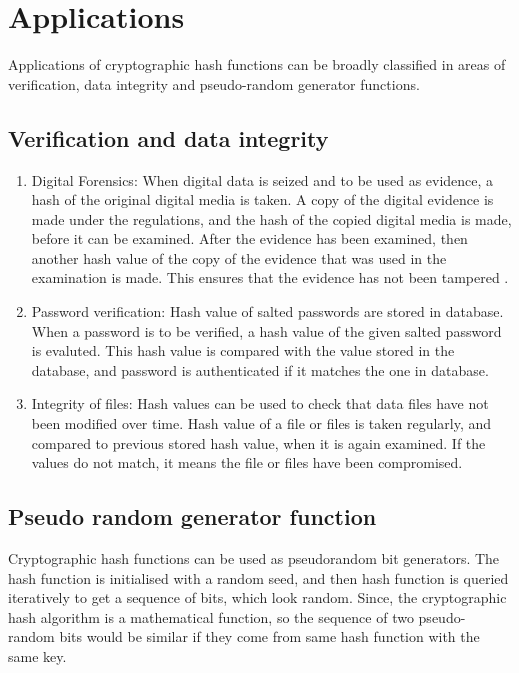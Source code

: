 \section{Applications}

Applications of cryptographic hash functions can be broadly classified in areas of verification, data
integrity and pseudo-random generator functions.

  \subsection{Verification and data integrity}
  \begin{enumerate}

    \item Digital Forensics: When digital data is seized and to be used as evidence, a hash of the original
    digital media is taken. A copy of the digital evidence is made under the regulations, and the hash of the
    copied digital media is made, before it can be examined. After the evidence has been examined, then another
    hash value of the copy of the evidence that was used in the examination is made. This ensures that the evidence
    has not been tampered \cite{00013}.

    \item Password verification: Hash value of salted passwords are stored in database. When a password is to be
    verified, a hash value of the given salted password is evaluted. This hash value is compared
    with the value stored in the database, and password is authenticated if it matches the one in database.

    \item Integrity of files: Hash values can be used to check that data files have not been modified over
    time. Hash value of a file or files is taken regularly, and compared to previous stored hash value, when it is
    again examined. If the values do not match, it means the file or files have been compromised.
  \end{enumerate}

  \subsection{Pseudo random generator function}
  Cryptographic hash functions can be used as pseudorandom bit generators. The hash function is initialised
  with a random seed, and then hash function is queried iteratively to get a sequence of bits, which look random.
  Since, the cryptographic hash algorithm is a mathematical function, so the sequence of two pseudo-random bits 
  would be similar if they come from same hash function with the same key.
